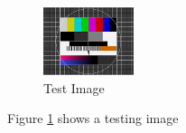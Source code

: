 \documentclass{article}
\begin{document}
\begin{figure}
\includegraphics[width=100px]{"images/test"}
\caption{Test Image}
\label{fig:test}
\end{figure}
Figure \ref{fig:test} shows a testing image
\end{document}
